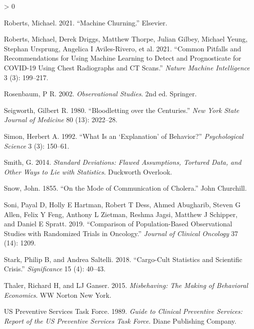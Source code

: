 \documentclass[
  10pt,
  b5paper]{book}
\newlength{\cslhangindent}
\newenvironment{CSLReferences}[2] %
 {%
  \setlength{\parindent}{0pt}
  \ifodd #1 \everypar{\setlength{\hangindent}{\cslhangindent}}\ignorespaces\fi
  \ifnum #2 > 0
  \setlength{\parskip}{#2\baselineskip}
  \fi
 }%
 {}
\begin{document}
\begin{CSLReferences}{1}{0}
\leavevmode\hypertarget{ref-roberts2021machine}{}%
Roberts, Michael. 2021. {``Machine Churning.''} Elsevier.

\leavevmode\hypertarget{ref-roberts2021common}{}%
Roberts, Michael, Derek Driggs, Matthew Thorpe, Julian Gilbey, Michael Yeung, Stephan Ursprung, Angelica I Aviles-Rivero, et al. 2021. {``Common Pitfalls and Recommendations for Using Machine Learning to Detect and Prognosticate for COVID-19 Using Chest Radiographs and CT Scans.''} \emph{Nature Machine Intelligence} 3 (3): 199--217.

\leavevmode\hypertarget{ref-RosBook}{}%
Rosenbaum, P R. 2002. \emph{Observational Studies}. 2nd ed. Springer.

\leavevmode\hypertarget{ref-seigworth1980bloodletting}{}%
Seigworth, Gilbert R. 1980. {``Bloodletting over the Centuries.''} \emph{New York State Journal of Medicine} 80 (13): 2022--28.

\leavevmode\hypertarget{ref-simon1992explanation}{}%
Simon, Herbert A. 1992. {``What Is an {`Explanation'} of Behavior?''} \emph{Psychological Science} 3 (3): 150--61.

\leavevmode\hypertarget{ref-smith-sd}{}%
Smith, G. 2014. \emph{Standard Deviations: Flawed Assumptions, Tortured Data, and Other Ways to Lie with Statistics}. Duckworth Overlook.

\leavevmode\hypertarget{ref-snow1849mode}{}%
Snow, John. 1855. {``On the Mode of Communication of Cholera.''} John Churchill.

\leavevmode\hypertarget{ref-soni2019comparison}{}%
Soni, Payal D, Holly E Hartman, Robert T Dess, Ahmed Abugharib, Steven G Allen, Felix Y Feng, Anthony L Zietman, Reshma Jagsi, Matthew J Schipper, and Daniel E Spratt. 2019. {``Comparison of Population-Based Observational Studies with Randomized Trials in Oncology.''} \emph{Journal of Clinical Oncology} 37 (14): 1209.

\leavevmode\hypertarget{ref-stark2018cargo}{}%
Stark, Philip B, and Andrea Saltelli. 2018. {``Cargo-Cult Statistics and Scientific Crisis.''} \emph{Significance} 15 (4): 40--43.

\leavevmode\hypertarget{ref-thaler2015misbehaving}{}%
Thaler, Richard H, and LJ Ganser. 2015. \emph{Misbehaving: The Making of Behavioral Economics}. WW Norton New York.

\leavevmode\hypertarget{ref-us1989guide}{}%
US Preventive Services Task Force. 1989. \emph{Guide to Clinical Preventive Services: Report of the US Preventive Services Task Force}. Diane Publishing Company.


\end{CSLReferences}
\end{document}
